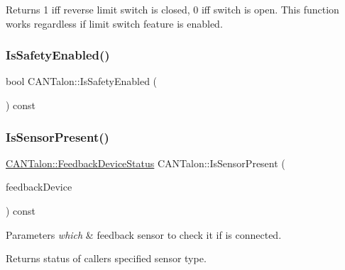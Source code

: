 \begin{DoxyReturn}{Returns}
\textquotesingle{}1\textquotesingle{} iff reverse limit switch is closed, 0 iff switch is open. This function works regardless if limit switch feature is enabled. 
\end{DoxyReturn}
\mbox{\label{class_c_a_n_talon_a4305b1c9d5f9459702bfa68c44b0887f}} 
\subsubsection{\texorpdfstring{Is\+Safety\+Enabled()}{IsSafetyEnabled()}}
{\footnotesize\ttfamily bool C\+A\+N\+Talon\+::\+Is\+Safety\+Enabled (\begin{DoxyParamCaption}{ }\end{DoxyParamCaption}) const\hspace{0.3cm}{\ttfamily [override]}}

\mbox{\label{class_c_a_n_talon_a2fcdeff79b199573b81b9bc68b98443d}} 
\subsubsection{\texorpdfstring{Is\+Sensor\+Present()}{IsSensorPresent()}}
{\footnotesize\ttfamily \hyperlink{class_c_a_n_talon_a9df2b5d336c09be76604dcb39da32172}{C\+A\+N\+Talon\+::\+Feedback\+Device\+Status} C\+A\+N\+Talon\+::\+Is\+Sensor\+Present (\begin{DoxyParamCaption}\item[{\hyperlink{class_c_a_n_talon_a4a8af675a7712f305d17be2b825005e3}{Feedback\+Device}}]{feedback\+Device }\end{DoxyParamCaption}) const\hspace{0.3cm}{\ttfamily [virtual]}}


\begin{DoxyParams}{Parameters}
{\em which} & feedback sensor to check it if is connected. \\
\hline
\end{DoxyParams}
\begin{DoxyReturn}{Returns}
status of caller\textquotesingle{}s specified sensor type. 
\end{DoxyReturn}
\mbox{\label{class_c_a_n_talon_ab612b5009dc905b6a5df4968cbbcfbb9}} 
